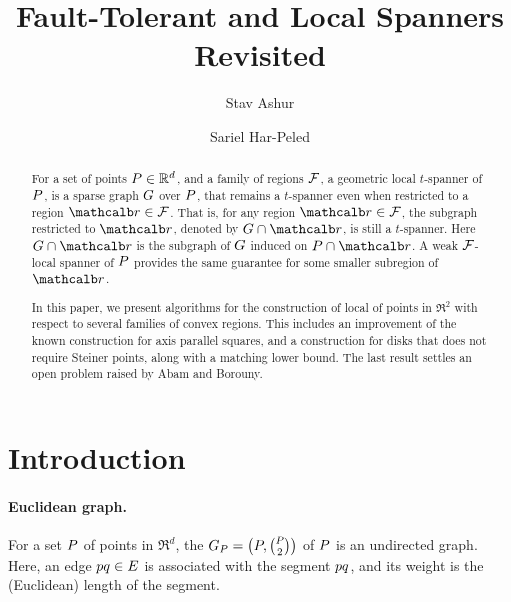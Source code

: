\documentclass[12pt]{article}%
\begin{document}
\title{Fault-Tolerant and Local Spanners Revisited}

\author{%
   Stav Ashur%
   \StavThanks{}%
   \and%
   Sariel Har-Peled%
}%

\maketitle



\begin{abstract}
    For a set of points $P\in \mathbb{R}^d$, and a family of regions $\mathcal{F}$,
    a geometric local $t$-spanner of $P$, is a sparse graph $G$
    over $P$, that remains a $t$-spanner even when restricted to a
    region $\region \in \FF$. That is, for any region
    $\region \in \FF$, the subgraph restricted to $\region$, denoted
    by $\restrictY{\G}{\region}$, is still a $t$-spanner. Here
    $\restrictY{\G}{\region}$ is the subgraph of $G$ induced on
    $\PS \cap \region$.  A weak $\mathcal{F}$-local spanner of $P$
    provides the same guarantee for some smaller subregion of
    $\region$.

    In this paper, we present algorithms for the construction of local
    of points in $\Re^2$ with respect to several families of convex
    regions. This includes an improvement of the known construction
    for axis parallel squares, and a construction for disks that does
    not require Steiner points, along with a matching lower bound. The
    last result settles an open problem raised by Abam and Borouny.
\end{abstract}



\section{Introduction}

\paragraph{Euclidean graph.}
For a set $P$ of points in $\Re^d$, the 
$G_P = \bigl(P, \binom{P}{2}\bigr)$ of $P$ is an undirected
graph.  Here, an edge $p q \in E$ is associated with the segment
$pq$, and its weight is the (Euclidean) length of the segment.
\end{document}
